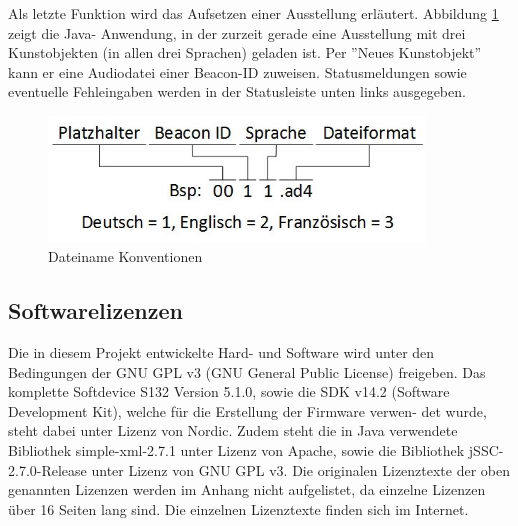 Als letzte Funktion wird das Aufsetzen einer Ausstellung erläutert. Abbildung \ref{fig:soft_6} zeigt die Java- Anwendung, in der zurzeit gerade eine Ausstellung mit drei Kunstobjekten (in allen drei Sprachen) geladen ist. Per ''Neues Kunstobjekt'' kann er eine Audiodatei einer Beacon-ID zuweisen. Statusmeldungen sowie eventuelle Fehleingaben werden in der Statusleiste unten links ausgegeben.
\begin{figure}[h]
	\centering
	\includegraphics[width=10cm]{graphics/Dateiname_Konvention.jpeg}
	\caption{Dateiname Konventionen}
	\label{fig:soft_6}
\end{figure}

\newpage

\subsection{Softwarelizenzen}
Die in diesem Projekt entwickelte Hard- und Software wird unter den Bedingungen der GNU
GPL v3 (GNU General Public License) freigeben. Das komplette Softdevice S132 Version 5.1.0,
sowie die SDK v14.2 (Software Development Kit), welche für die Erstellung der Firmware verwen-
det wurde, steht dabei unter Lizenz von Nordic. Zudem steht die in Java verwendete Bibliothek
simple-xml-2.7.1 unter Lizenz von Apache, sowie die Bibliothek jSSC-2.7.0-Release unter Lizenz
von GNU GPL v3.
Die originalen Lizenztexte der oben genannten Lizenzen werden im Anhang nicht aufgelistet, da einzelne Lizenzen über 16 Seiten lang sind. Die einzelnen Lizenztexte finden sich im Internet.

\clearpage












